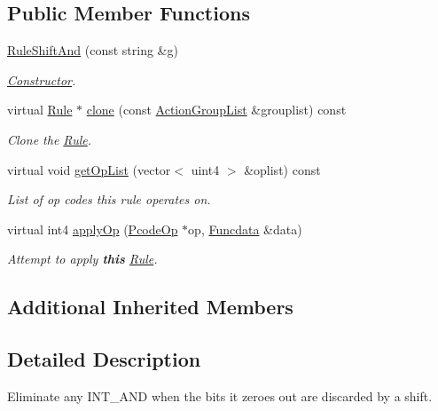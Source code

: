 \subsection*{Public Member Functions}
\begin{DoxyCompactItemize}
\item 
\mbox{\hyperlink{class_rule_shift_and_a798bf5be439f15c57dfbffb7dfab9244}{Rule\+Shift\+And}} (const string \&g)
\begin{DoxyCompactList}\small\item\em \mbox{\hyperlink{class_constructor}{Constructor}}. \end{DoxyCompactList}\item 
virtual \mbox{\hyperlink{class_rule}{Rule}} $\ast$ \mbox{\hyperlink{class_rule_shift_and_a3afbafd2204add57aded444eea904f56}{clone}} (const \mbox{\hyperlink{class_action_group_list}{Action\+Group\+List}} \&grouplist) const
\begin{DoxyCompactList}\small\item\em Clone the \mbox{\hyperlink{class_rule}{Rule}}. \end{DoxyCompactList}\item 
virtual void \mbox{\hyperlink{class_rule_shift_and_ae41a87fb89b843d28c1e953aa28376c1}{get\+Op\+List}} (vector$<$ uint4 $>$ \&oplist) const
\begin{DoxyCompactList}\small\item\em List of op codes this rule operates on. \end{DoxyCompactList}\item 
virtual int4 \mbox{\hyperlink{class_rule_shift_and_a46abea946abb40fa7bed25e4157d0f13}{apply\+Op}} (\mbox{\hyperlink{class_pcode_op}{Pcode\+Op}} $\ast$op, \mbox{\hyperlink{class_funcdata}{Funcdata}} \&data)
\begin{DoxyCompactList}\small\item\em Attempt to apply {\bfseries{this}} \mbox{\hyperlink{class_rule}{Rule}}. \end{DoxyCompactList}\end{DoxyCompactItemize}
\subsection*{Additional Inherited Members}


\subsection{Detailed Description}
Eliminate any I\+N\+T\+\_\+\+A\+ND when the bits it zeroes out are discarded by a shift. 

